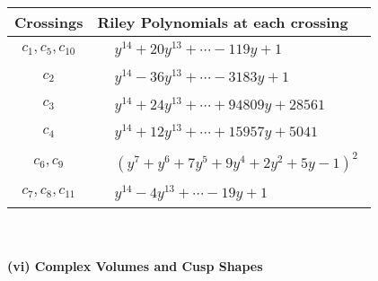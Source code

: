 \documentclass[1p]{elsarticle_modified}
\theoremstyle{definition}
\begin{document}
\begin{tabular}{m{50pt}|m{274pt}}
Crossings & \hspace{64pt}Riley Polynomials at each crossing \\
\hline $$\begin{aligned}c_{1},c_{5},c_{10}\end{aligned}$$&$\begin{aligned}
&y^{14}+20 y^{13}+\cdots-119 y+1
\end{aligned}$\\
\hline $$\begin{aligned}c_{2}\end{aligned}$$&$\begin{aligned}
&y^{14}-36 y^{13}+\cdots-3183 y+1
\end{aligned}$\\
\hline $$\begin{aligned}c_{3}\end{aligned}$$&$\begin{aligned}
&y^{14}+24 y^{13}+\cdots+94809 y+28561
\end{aligned}$\\
\hline $$\begin{aligned}c_{4}\end{aligned}$$&$\begin{aligned}
&y^{14}+12 y^{13}+\cdots+15957 y+5041
\end{aligned}$\\
\hline $$\begin{aligned}c_{6},c_{9}\end{aligned}$$&$\begin{aligned}
&(y^7+y^6+7 y^5+9 y^4+2 y^2+5 y-1)^2
\end{aligned}$\\
\hline $$\begin{aligned}c_{7},c_{8},c_{11}\end{aligned}$$&$\begin{aligned}
&y^{14}-4 y^{13}+\cdots-19 y+1
\end{aligned}$\\
\hline
\end{tabular}\\~\\
\newpage\flushleft \textbf{(vi) Complex Volumes and Cusp Shapes}
\end{document}

